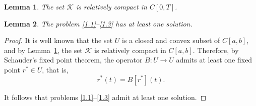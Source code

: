 \documentclass[10pt,a4paper]{amsart}
\newtheorem{lem}{Lemma}
\begin{document}
\begin{lem} \label{lem5.5} The set $\mathcal{K}$ is relatively compact in $C[0,T]$.
\end{lem}

\begin{lem} \label{lem5.6} The problem \eqref{1.1}--\eqref{1.3} has at least one solution.
\end{lem}

\begin{proof} 
It is well known that the set $U$ is a closed and convex subset of $C[a,b]$, and by Lemma~\ref{lem5.5}, the set $\mathcal{K}$ is relatively compact in $C[a,b]$. Therefore, by Schauder’s fixed point theorem, the operator $B: U \to U$ admits at least one fixed point $r^* \in U$, that is,
$$
r^*(t) = B[r^*](t).
$$

It follows that problems \eqref{1.1}–\eqref{1.3} admit at least one solution.

\end{proof}
\end{document}
